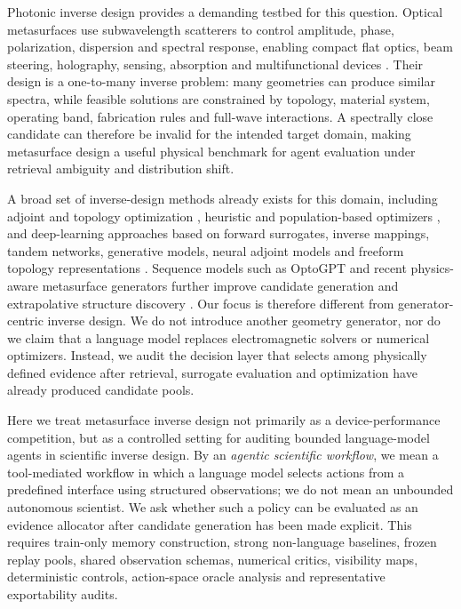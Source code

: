 \documentclass[final,1p,times]{elsarticle}
\begin{document}
Photonic inverse design provides a demanding testbed for this question. Optical metasurfaces use subwavelength scatterers to control amplitude, phase, polarization, dispersion and spectral response, enabling compact flat optics, beam steering, holography, sensing, absorption and multifunctional devices \cite{yu2011light, kildishev2013planar, chen2016review, arbabi2015dielectric, hsiao2017fundamentals, genevet2017recent}. Their design is a one-to-many inverse problem: many geometries can produce similar spectra, while feasible solutions are constrained by topology, material system, operating band, fabrication rules and full-wave interactions. A spectrally close candidate can therefore be invalid for the intended target domain, making metasurface design a useful physical benchmark for agent evaluation under retrieval ambiguity and distribution shift.

A broad set of inverse-design methods already exists for this domain, including adjoint and topology optimization \cite{lalau2013adjoint, piggott2015inverse, molesky2018inverse, mansouree2020multifunctional, christiansen2021inverse}, heuristic and population-based optimizers \cite{kennedy1995particle, hansen2006cma}, and deep-learning approaches based on forward surrogates, inverse mappings, tandem networks, generative models, neural adjoint models and freeform topology representations \cite{liu2018training, so2020deep, ma2025benchmarking, jiang2019global, an2019deep, park2022free}. Sequence models such as OptoGPT and recent physics-aware metasurface generators further improve candidate generation and extrapolative structure discovery \cite{ma2023optogpt,li2026currentdiffusion}. Our focus is therefore different from generator-centric inverse design. We do not introduce another geometry generator, nor do we claim that a language model replaces electromagnetic solvers or numerical optimizers. Instead, we audit the decision layer that selects among physically defined evidence after retrieval, surrogate evaluation and optimization have already produced candidate pools.

Here we treat metasurface inverse design not primarily as a device-performance competition, but as a controlled setting for auditing bounded language-model agents in scientific inverse design. By an \emph{agentic scientific workflow}, we mean a tool-mediated workflow in which a language model selects actions from a predefined interface using structured observations; we do not mean an unbounded autonomous scientist. We ask whether such a policy can be evaluated as an evidence allocator after candidate generation has been made explicit. This requires train-only memory construction, strong non-language baselines, frozen replay pools, shared observation schemas, numerical critics, visibility maps, deterministic controls, action-space oracle analysis and representative exportability audits.
\end{document}

